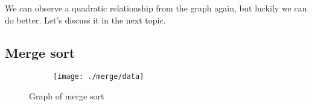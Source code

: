 \documentclass[a4paper,11pt]{article}
\begin{document}
    We can observe a quadratic relationship from the graph again, but luckily we can do better.
    Let's discuss it in the next topic.

    \subsection*{Merge sort}

    \begin{figure}[h]
        \centering
        \begin{subfigure}[b]{.5\textwidth}
            \centering
            \texttt{[image: ./merge/data]} %
        \end{subfigure}
        \caption{Graph of merge sort}
        \label{fig:graph_3}
    \end{figure}
\end{document}

